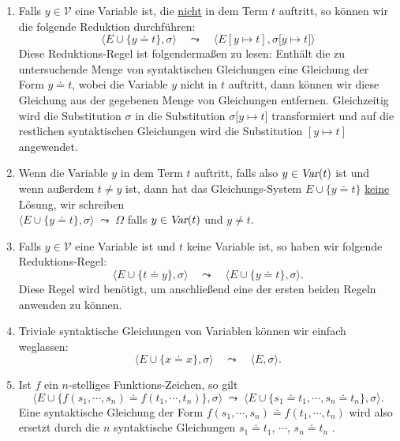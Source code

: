 \begin{enumerate}
\item Falls $y\in\mathcal{V}$ eine Variable ist, die \underline{\color{red}nicht} in dem Term $t$ auftritt, so
      können wir die folgende Reduktion durchführen: 
      \[ \Big\langle E \cup \big\{ y \doteq t \big\}, \sigma \Big\rangle \quad\leadsto\quad 
         \Big\langle E[y \mapsto t], \sigma\big[ y \mapsto t \big] \Big\rangle 
      \]
      Diese Reduktions-Regel ist folgendermaßen zu lesen: Enthält die zu untersuchende
      Menge von syntaktischen Gleichungen eine Gleichung der Form $y \doteq t$, wobei die
      Variable $y$ nicht in $t$ auftritt, dann können wir diese Gleichung aus der
      gegebenen Menge von Gleichungen entfernen.  Gleichzeitig wird die Substitution
      $\sigma$ in die Substitution $\sigma\big[ y \mapsto t \big]$ transformiert und auf die restlichen syntaktischen Gleichungen
      wird die Substitution $[y \mapsto t]$ angewendet.
\item Wenn die Variable $y$  in dem Term $t$ auftritt, falls also $y \in \textsl{Var}(t)$
      ist und wenn außerdem $t \not= y$ ist, dann hat das Gleichungs-System 
      $E \cup \big\{ y \doteq t \big\}$ \underline{\color{red}keine} Lösung, wir schreiben 
      \\[0.2cm]
      \hspace*{1.3cm}
      $\Big\langle E \cup \big\{ y \doteq t \big\}, \sigma \Big\rangle\;\leadsto\; \Omega$ \quad
      falls $y \in \textsl{Var}(t)$ und $y \not=t$.
\item Falls $y\in\mathcal{V}$ eine Variable ist und $t$ keine Variable ist, so haben wir folgende Reduktions-Regel:
      \[ \Big\langle E \cup \big\{ t \doteq y \big\}, \sigma \Big\rangle \quad\leadsto\quad 
         \Big\langle E \cup \big\{ y \doteq t \big\}, \sigma \Big\rangle.
      \]   
      Diese Regel wird benötigt, um anschließend eine der ersten beiden Regeln anwenden zu
      können.
\item Triviale syntaktische Gleichungen von Variablen können wir einfach weglassen:
      \[ \Big\langle E \cup \big\{ x \doteq x \big\}, \sigma \Big\rangle \quad\leadsto\quad
         \Big\langle E, \sigma \Big\rangle.
      \]   
\item Ist $f$ ein $n$-stelliges Funktions-Zeichen, so gilt 
      \[ \Big\langle E \cup \big\{ f(s_1,\cdots,s_n) \doteq f(t_1,\cdots,t_n) \big\}, \sigma \Big\rangle 
         \;\leadsto\; 
         \Big\langle E \cup \big\{ s_1 \doteq t_1, \cdots, s_n \doteq t_n\}, \sigma \Big\rangle.
      \]   
      Eine syntaktische Gleichung der Form $f(s_1,\cdots,s_n) \doteq f(t_1,\cdots,t_n)$
      wird also ersetzt durch die $n$ syntaktische Gleichungen $s_1 \doteq t_1$, $\cdots$, $s_n \doteq t_n$      .


\end{enumerate}
